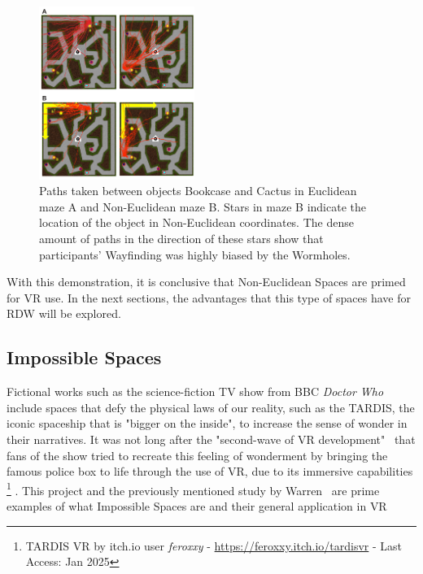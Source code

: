 \begin{figure}[h]
    \centering
    \includegraphics[width=0.45\textwidth]{NOVAthesisFiles/Images/papers/warrens-mazes-paths.png}
    \caption[Paths users took in study by Warren]{Paths taken between objects Bookcase and Cactus in Euclidean maze A and Non-Euclidean maze B. 
    Stars in maze B indicate the location of the object in Non-Euclidean coordinates. The dense amount of paths in the direction of these 
    stars show that participants' Wayfinding was highly biased by the Wormholes.~\cite{Warren2019}}
    \label{fig:warrens-mazes-paths}
\end{figure}
With this demonstration, it is conclusive that Non-Euclidean Spaces are primed for \gls{VR} use. In the next sections, the advantages that this 
type of spaces have for \gls{RDW} will be explored.

\subsection{Impossible Spaces}
\label{sec:impossible-spaces}

Fictional works such as the science-fiction TV show from BBC \textit{Doctor Who} include spaces that defy the physical laws of our reality, 
such as the TARDIS, the iconic spaceship that is "bigger on the inside", to increase the sense of wonder in their narratives. 
It was not long after the "second-wave of \gls{VR} development"~\cite{Anthes2016} that fans of the show tried to recreate this feeling of 
wonderment by bringing the famous police box to life through the use of \gls{VR}, due to its immersive capabilities
\footnote{TARDIS VR by itch.io user \textit{feroxxy} - \href{https://feroxxy.itch.io/tardisvr}{https://feroxxy.itch.io/tardisvr} - Last Access: Jan 2025 } 
. This project and the previously mentioned study by Warren~\cite{Warren2019} are prime examples of what Impossible Spaces are and their 
general application in \gls{VR}

